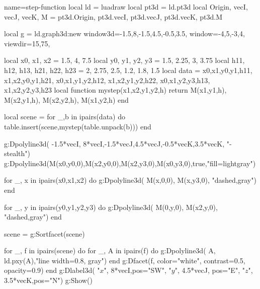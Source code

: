\documentclass{standalone}
\begin{document}
\begin{luadraw}{name=step-function}
local ld = luadraw
local pt3d = ld.pt3d
local Origin, vecI, vecJ, vecK, M = pt3d.Origin, pt3d.vecI, pt3d.vecJ, pt3d.vecK, pt3d.M

local g = ld.graph3d:new{
    window3d={-1.5,8,-1.5,4.5,-0.5,3.5}, 
    window={-4,5,-3,4}, 
    viewdir={15,75}, 
}

local x0, x1, x2 = 1.5, 4, 7.5
local y0, y1, y2, y3 = 1.5, 2.25, 3, 3.75
local h11, h12, h13, h21, h22, h23 = 2, 2.75, 2.5, 1.2, 1.8, 1.5
local data = {
    {x0,x1,y0,y1,h11},
    {x1,x2,y0,y1,h21},
    {x0,x1,y1,y2,h12},
    {x1,x2,y1,y2,h22},
    {x0,x1,y2,y3,h13},
    {x1,x2,y2,y3,h23}
}
local function mystep(x1,x2,y1,y2,h)
    return {M(x1,y1,h), M(x2,y1,h), M(x2,y2,h), M(x1,y2,h)}
end

local scene = {}
for _,b in ipairs(data) do
    table.insert(scene,mystep(table.unpack(b)))
end

g:Dpolyline3d( {{-1.5*vecI, 8*vecI},{-1.5*vecJ,4.5*vecJ},{-0.5*vecK,3.5*vecK}}, "-stealth")
g:Dpolyline3d({M(x0,y0,0),M(x2,y0,0),M(x2,y3,0),M(x0,y3,0)},true,"fill=lightgray")

for _, x in ipairs({x0,x1,x2}) do
    g:Dpolyline3d( {M(x,0,0), M(x,y3,0)}, "dashed,gray")
end

for _, y in ipairs({y0,y1,y2,y3}) do
    g:Dpolyline3d( {M(0,y,0), M(x2,y,0)}, "dashed,gray")
end

scene = g:Sortfacet(scene)

for _, f in ipairs(scene) do
    for _, A in ipairs(f) do
        g:Dpolyline3d( {A, ld.pxy(A)},"line width=0.8, gray")
    end
    g:Dfacet(f, {color="white", contrast=0.5, opacity=0.9})
end
g:Dlabel3d( "$x$", 8*vecI,{pos="SW"}, "$y$", 4.5*vecJ, {pos="E"}, "$z$", 3.5*vecK,{pos="N"})
g:Show()
\end{luadraw}
\end{document}
